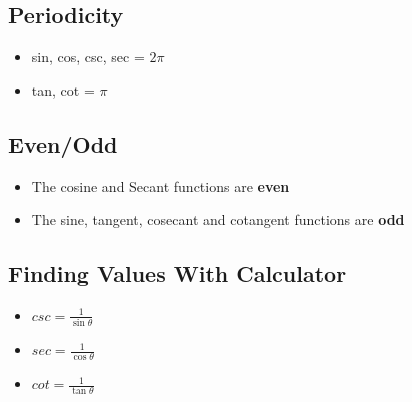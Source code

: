 \documentclass{report}
\begin{document}
        \bigbreak \noindent \bigbreak \noindent 
        \subsection{Periodicity}
        \begin{itemize}
          \item sin, cos, csc, sec = $2\pi$
          \item tan, cot = $\pi$
        \end{itemize}

        \bigbreak \noindent \bigbreak \noindent 
        \subsection{Even/Odd}
        \begin{itemize}
          \item The cosine and Secant functions are \textbf{even}
          \item The sine, tangent, cosecant and cotangent functions are \textbf{odd}
        \end{itemize}

        \bigbreak \noindent \bigbreak \noindent 
        \subsection{
          Finding Values With Calculator
        }
        \begin{itemize}
         \item $csc = \frac{1}{\sin{\theta}} $
          \item $sec = \frac{1}{\cos{\theta }} $
          \item $cot = \frac{1}{\tan{\theta }} $
        \end{itemize}

        \bigbreak \noindent \bigbreak \noindent 
\end{document}
